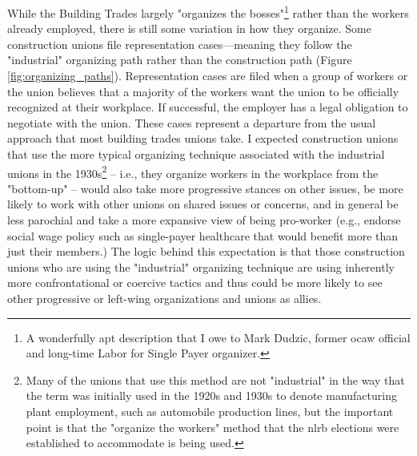 \documentclass[12pt]{article}
\begin{document}
While the Building Trades largely "organizes the bosses"\footnote{A wonderfully apt description that I owe to Mark Dudzic, former \acrshort{ocaw} official and long-time Labor for Single Payer organizer.} rather than the workers already employed, there is still some variation in how they organize. Some construction unions file representation cases---meaning they follow the "industrial" organizing path rather than the construction path (Figure \ref{fig:organizing_paths}). Representation cases are filed when a group of workers or the union believes that a majority of the workers want the union to be officially recognized at their workplace. If successful, the employer has a legal obligation to negotiate with the union. These cases represent a departure from the usual approach that most building trades unions take. I expected construction unions that use the more typical organizing technique associated with the industrial unions in the 1930s\footnote{Many of the unions that use this method are not "industrial" in the way that the term was initially used in the 1920s and 1930s to denote manufacturing plant employment, such as automobile production lines, but the important point is that the "organize the workers" method that the \acrshort{nlrb} elections were established to accommodate is being used.} -- i.e., they organize workers in the workplace from the "bottom-up" -- would also take more progressive stances on other issues, be more likely to work with other unions on shared issues or concerns, and in general be less parochial and take a more expansive view of being pro-worker (e.g., endorse social wage policy such as single-payer healthcare that would benefit more than just their members.) The logic behind this expectation is that those construction unions who are using the "industrial" organizing technique are using inherently more confrontational or coercive tactics and thus could be more likely to see other progressive or left-wing organizations and unions as allies.
\end{document}
